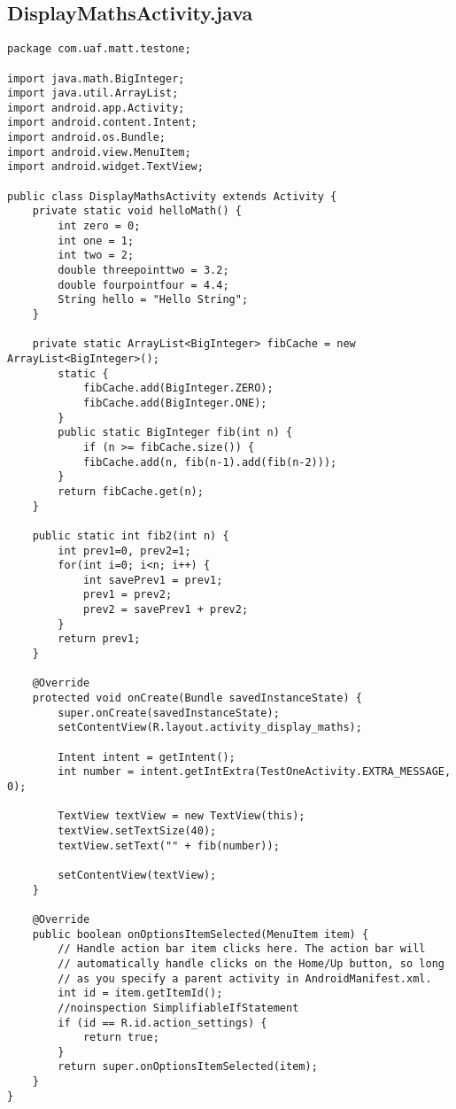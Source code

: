 \subsection{DisplayMathsActivity.java}
\label{app:camathsactivity}
\begin{lstlisting}
package com.uaf.matt.testone;

import java.math.BigInteger;
import java.util.ArrayList;
import android.app.Activity;
import android.content.Intent;
import android.os.Bundle;
import android.view.MenuItem;
import android.widget.TextView;

public class DisplayMathsActivity extends Activity {
    private static void helloMath() {
        int zero = 0;
        int one = 1;
        int two = 2;
        double threepointtwo = 3.2;
        double fourpointfour = 4.4;
        String hello = "Hello String";
    }

    private static ArrayList<BigInteger> fibCache = new ArrayList<BigInteger>();
        static {
            fibCache.add(BigInteger.ZERO);
            fibCache.add(BigInteger.ONE);
        }
        public static BigInteger fib(int n) {
            if (n >= fibCache.size()) {
            fibCache.add(n, fib(n-1).add(fib(n-2)));
        }
        return fibCache.get(n);
    }

    public static int fib2(int n) {
        int prev1=0, prev2=1;
        for(int i=0; i<n; i++) {
            int savePrev1 = prev1;
            prev1 = prev2;
            prev2 = savePrev1 + prev2;
        }
        return prev1;
    }

    @Override
    protected void onCreate(Bundle savedInstanceState) {
        super.onCreate(savedInstanceState);
        setContentView(R.layout.activity_display_maths);

        Intent intent = getIntent();
        int number = intent.getIntExtra(TestOneActivity.EXTRA_MESSAGE, 0);

        TextView textView = new TextView(this);
        textView.setTextSize(40);
        textView.setText("" + fib(number));

        setContentView(textView);
    }

    @Override
    public boolean onOptionsItemSelected(MenuItem item) {
        // Handle action bar item clicks here. The action bar will
        // automatically handle clicks on the Home/Up button, so long
        // as you specify a parent activity in AndroidManifest.xml.
        int id = item.getItemId();
        //noinspection SimplifiableIfStatement
        if (id == R.id.action_settings) {
            return true;
        }
        return super.onOptionsItemSelected(item);
    }
}
\end{lstlisting}
